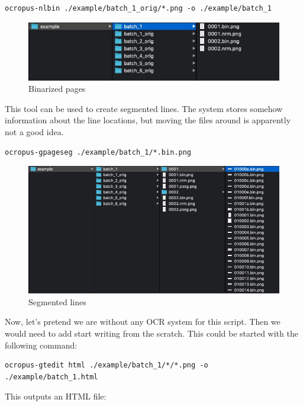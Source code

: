 \documentclass[]{book}
\begin{document}
\begin{verbatim}
ocropus-nlbin ./example/batch_1_orig/*.png -o ./example/batch_1
\end{verbatim}

\begin{figure}
\centering
\includegraphics{./images/ocropy_binarized_pages.jpg}
\caption{Binarized pages}
\end{figure}

This tool can be used to create segmented lines. The system stores somehow information about the line locations, but moving the files around is apparently not a good idea.

\begin{verbatim}
ocropus-gpageseg ./example/batch_1/*.bin.png
\end{verbatim}

\begin{figure}
\centering
\includegraphics{./images/ocropy_segmented_lines.jpg}
\caption{Segmented lines}
\end{figure}

Now, let's pretend we are without any OCR system for this script. Then we would need to add start writing from the scratch. This could be started with the following command:

\begin{verbatim}
ocropus-gtedit html ./example/batch_1/*/*.png -o ./example/batch_1.html
\end{verbatim}

This outputs an HTML file:
\end{document}
